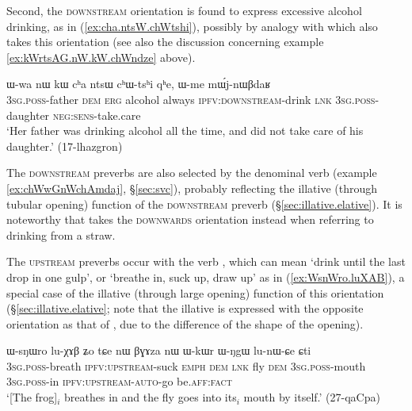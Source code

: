 Second, the \textsc{downstream} orientation is found to express excessive alcohol drinking, as in (\ref{ex:cha.ntsW.chWtshi}), possibly by analogy with  which also takes this orientation (see also the discussion concerning example \ref{ex:kWrtsAG.nW.kW.chWndze} above).

\begin{exe}
\ex \label{ex:cha.ntsW.chWtshi}
\gll  ɯ-wa nɯ kɯ cʰa ntsɯ cʰɯ-tsʰi qʰe, ɯ-me mɯ́j-nɯβdaʁ \\
\textsc{3sg}.\textsc{poss}-father \textsc{dem} \textsc{erg} alcohol always \textsc{ipfv}:\textsc{downstream}-drink \textsc{lnk} \textsc{3sg}.\textsc{poss}-daughter \textsc{neg}:\textsc{sens}-take.care \\
\glt `Her father was drinking alcohol all the time, and did not take care of his daughter.' (17-lhazgron)
\end{exe}

The \textsc{downstream} preverbs are also selected by the denominal verb  (example \ref{ex:chWwGnWchAmdaj}, §\ref{sec:svc}), probably reflecting the illative (through tubular opening) function of the \textsc{downstream} preverb (§\ref{sec:illative.elative}). It is noteworthy that  takes the \textsc{downwards} orientation instead when referring to drinking from a straw.


The \textsc{upstream} preverbs occur with the verb , which can mean `drink until the last drop in one gulp', or `breathe in, suck up, draw up' as in (\ref{ex:WsnWro.luXAB}), a special case of the illative  (through large opening) function of this orientation (§\ref{sec:illative.elative}; note that the illative is expressed with the opposite orientation as that of , due to the difference of the shape of the opening).

\begin{exe}
\ex \label{ex:WsnWro.luXAB}
\gll ɯ-sŋɯro lu-χɤβ ʑo tɕe nɯ βɣɤza nɯ ɯ-kɯr ɯ-ŋgɯ lu-nɯ-ɕe ɕti \\
\textsc{3sg}.\textsc{poss}-breath \textsc{ipfv}:\textsc{upstream}-suck \textsc{emph} \textsc{dem} \textsc{lnk} fly \textsc{dem} \textsc{3sg}.\textsc{poss}-mouth \textsc{3sg}.\textsc{poss}-in \textsc{ipfv}:\textsc{upstream}-\textsc{auto}-go be.\textsc{aff}:\textsc{fact} \\
\glt `[The frog]$_i$ breathes in and the fly goes into its$_i$ mouth by itself.' (27-qaCpa)
\end{exe}

